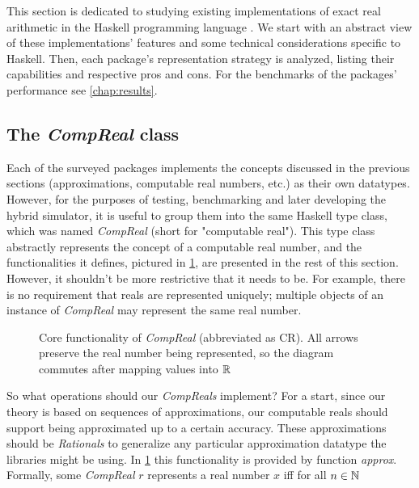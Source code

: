This section is dedicated to studying existing implementations of exact real arithmetic in the Haskell programming language \cite{Whitington2019,thompson-1996}. We start with an abstract view of these implementations' features and some technical considerations specific to Haskell. Then, each package's representation strategy is analyzed, listing their capabilities and respective pros and cons. For the benchmarks of the packages' performance see \cref{chap:results}.

\subsection{The \textit{CompReal} class}
\label{sec:features}

Each of the surveyed packages implements the concepts discussed in the previous sections (approximations, computable real numbers, etc.) as their own datatypes. However, for the purposes of testing, benchmarking and later developing the hybrid simulator, it is useful to group them into the same Haskell type class, which was named \textit{CompReal} (short for "computable real"). This type class abstractly represents the concept of a computable real number, and the functionalities it defines, pictured in \cref{fig:comp_real}, are presented in the rest of this section. However, it shouldn't be more restrictive that it needs to be. For example, there is no requirement that reals are represented uniquely; multiple objects of an instance of \textit{CompReal} may represent the same real number.

\begin{figure}[h]
    \centering
    
    \caption{Core functionality of \textit{CompReal} (abbreviated as CR). All arrows preserve the real number being represented, so the diagram commutes after mapping values into $\mathbb{R}$}
    \label{fig:comp_real}
\end{figure}

So what operations should our \textit{CompReals} implement? For a start, since our theory is based on sequences of approximations, our computable reals should support being approximated up to a certain accuracy. These approximations should be \textit{Rationals} to generalize any particular approximation datatype the libraries might be using. In \cref{fig:comp_real} this functionality is provided by function \textit{approx}. Formally, some \textit{CompReal} $r$ represents a real number $x$ iff for all $n \in \mathbb{N}$

